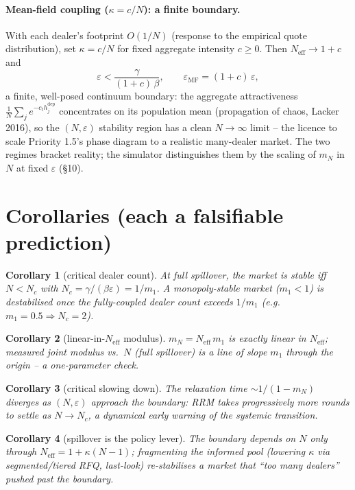 \documentclass[11pt]{article}
\newtheorem{corollary}{Corollary}
\newcommand{\eps}{\varepsilon}
\newcommand{\Neff}{N_{\mathrm{eff}}}
\begin{document}
\paragraph{Mean-field coupling ($\kappa=c/N$): a finite boundary.}
With each dealer's footprint $O(1/N)$ (response to the empirical quote distribution),
set $\kappa=c/N$ for fixed aggregate intensity $c\ge0$. Then $\Neff\to 1+c$ and
%
\begin{equation}
  \eps < \frac{\gamma}{(1+c)\,\beta},\qquad \eps_{\mathrm{MF}}=(1+c)\,\eps,
\end{equation}
%
a finite, well-posed continuum boundary: the aggregate attractiveness
$\tfrac1N\sum_j e^{-c_t h_j^{\mathrm{dep}}}$ concentrates on its population mean
(propagation of chaos, Lacker 2016), so the $(N,\eps)$ stability region has a clean
$N\to\infty$ limit -- the licence to scale Priority 1.5's phase diagram to a
realistic many-dealer market. The two regimes bracket reality; the simulator
distinguishes them by the scaling of $m_N$ in $N$ at fixed $\eps$ (\S10).

\section{Corollaries (each a falsifiable prediction)}

\begin{corollary}[critical dealer count]
At full spillover, the market is stable iff $N<N_c$ with $N_c=\gamma/(\beta\eps)=1/m_1$.
A monopoly-stable market ($m_1<1$) is destabilised once the fully-coupled dealer
count exceeds $1/m_1$ (e.g.\ $m_1=0.5\Rightarrow N_c=2$).
\end{corollary}

\begin{corollary}[linear-in-$\Neff$ modulus]
$m_N=\Neff\,m_1$ is exactly linear in $\Neff$; measured joint modulus vs.\ $N$ (full
spillover) is a line of slope $m_1$ through the origin -- a one-parameter check.
\end{corollary}

\begin{corollary}[critical slowing down]
The relaxation time $\sim 1/(1-m_N)$ diverges as $(N,\eps)$ approach the boundary:
RRM takes progressively more rounds to settle as $N\to N_c$, a dynamical early
warning of the systemic transition.
\end{corollary}

\begin{corollary}[spillover is the policy lever]
The boundary depends on $N$ only through $\Neff=1+\kappa(N-1)$; fragmenting the
informed pool (lowering $\kappa$ via segmented/tiered RFQ, last-look) re-stabilises a
market that ``too many dealers'' pushed past the boundary.
\end{corollary}
\end{document}
